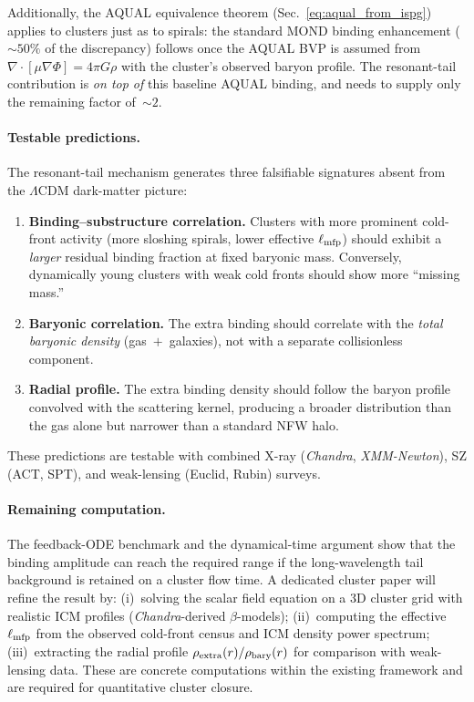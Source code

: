 \documentclass[11pt]{article}
\begin{document}
Additionally, the AQUAL equivalence theorem
(Sec.~\ref{eq:aqual_from_ispg}) applies to clusters just as to
spirals: the standard MOND binding enhancement
($\sim\!50\%$ of the discrepancy) follows once the AQUAL BVP is assumed from
$\nabla\!\cdot\![\mu\nabla\Phi]=4\pi G\rho$ with the cluster's
observed baryon profile.  The resonant-tail contribution is
\emph{on top of} this baseline AQUAL binding, and needs to supply
only the remaining factor of~$\sim\!2$.

\paragraph{Testable predictions.}
The resonant-tail mechanism generates three falsifiable signatures
absent from the $\Lambda$CDM dark-matter picture:
\begin{enumerate}
\item \textbf{Binding--substructure correlation.}
  Clusters with more prominent cold-front activity (more sloshing
  spirals, lower effective $\ell_{\rm mfp}$) should exhibit a
  \emph{larger} residual binding fraction at fixed baryonic mass.
  Conversely, dynamically young clusters with weak cold fronts
  should show more ``missing mass.''
\item \textbf{Baryonic correlation.}
  The extra binding should correlate with the \emph{total
  baryonic density} (gas~$+$~galaxies), not with a separate
  collisionless component.
\item \textbf{Radial profile.}
  The extra binding density should follow the baryon profile
  convolved with the scattering kernel, producing a broader
  distribution than the gas alone but narrower than a standard
  NFW halo.
\end{enumerate}
These predictions are testable with combined X-ray (\textit{Chandra},
\textit{XMM-Newton}), SZ (ACT, SPT), and weak-lensing
(Euclid, Rubin) surveys.

\paragraph{Remaining computation.}
The feedback-ODE benchmark and the dynamical-time argument show that
the binding amplitude can reach the required range if the
long-wavelength tail background is retained on a cluster flow time.
A dedicated cluster paper will refine the result by:
(i)~solving the scalar field equation on a 3D cluster grid
with realistic ICM profiles (\textit{Chandra}-derived $\beta$-models);
(ii)~computing the effective $\ell_{\rm mfp}$ from the observed
cold-front census and ICM density power spectrum;
(iii)~extracting the radial profile
$\rho_{\rm extra}(r)/\rho_{\rm bary}(r)$ for comparison with
weak-lensing data.
These are concrete computations within the existing framework and are
required for quantitative cluster closure.
\end{document}
